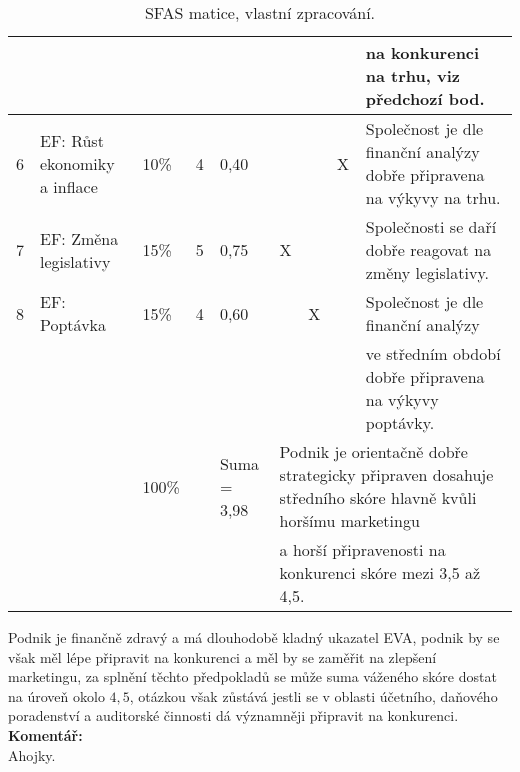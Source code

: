 \begin{table}[!hbtp]
{{\begin{tabular}{|l|l|l|l|l|llll|}
 &  &  &  &  & \multicolumn{1}{l|}{} & \multicolumn{1}{l|}{} & \multicolumn{1}{l|}{} & na konkurenci na trhu, viz předchozí bod. \\ \hline
6 & EF: Růst ekonomiky a inflace & 10\% & 4 & 0,40 & \multicolumn{1}{l|}{} & \multicolumn{1}{l|}{} & \multicolumn{1}{l|}{X} & Společnost je dle finanční analýzy dobře připravena na výkyvy na trhu. \\ \hline
7 & EF: Změna legislativy & 15\% & 5 & 0,75 & \multicolumn{1}{l|}{X} & \multicolumn{1}{l|}{} & \multicolumn{1}{l|}{} & Společnosti se daří dobře reagovat na změny legislativy. \\ \hline
8 & EF: Poptávka & 15\% & 4 & 0,60 & \multicolumn{1}{l|}{} & \multicolumn{1}{l|}{X} & \multicolumn{1}{l|}{} & Společnost je dle finanční analýzy \\
 &  &  &  &  & \multicolumn{1}{l|}{} & \multicolumn{1}{l|}{} & \multicolumn{1}{l|}{} & ve středním období dobře připravena na výkyvy poptávky. \\ \hline
\cellcolor[HTML]{C0C0C0} & \cellcolor[HTML]{C0C0C0} & 100\% & \cellcolor[HTML]{C0C0C0} & Suma = 3,98 & \multicolumn{4}{l|}{Podnik je orientačně dobře strategicky připraven dosahuje středního skóre hlavně kvůli horšímu marketingu} \\
\cellcolor[HTML]{C0C0C0} & \cellcolor[HTML]{C0C0C0} &  & \cellcolor[HTML]{C0C0C0} &  & \multicolumn{4}{l|}{a horší připravenosti na konkurenci skóre mezi 3,5 až 4,5.} \\ \hline
\end{tabular}
}
}
\caption[SFAS matice]{SFAS matice, vlastní zpracování.}
\label{tab:SFAS matice}
\end{table}

Podnik je finančně zdravý a má dlouhodobě kladný ukazatel EVA, podnik by se však měl lépe připravit na konkurenci a měl by se zaměřit na zlepšení marketingu, za splnění těchto předpokladů se může suma váženého skóre dostat na úroveň okolo $4,5$, otázkou však zůstává jestli se v oblasti účetního, daňového poradenství a auditorské činnosti dá významněji připravit na konkurenci.\\

\noindent\textbf{Komentář:}\\

Ahojky.
